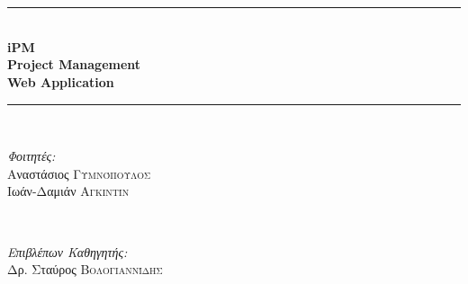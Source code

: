 \begin{titlepage}

\newcommand{\HRule}{\rule{\linewidth}{0.25mm}}

\center

 

\textsc{\LARGE {}}\\[1cm] 
\textsc{\large {}}\\[0.5cm] 

\HRule \\[0.4cm]
{ \huge \bfseries {iPM \\ Project Management \\Web Application}}\\[0.4cm]
\HRule \\[1.5cm]
 
\begin{minipage}{0.4\textwidth}
    \begin{flushleft}\large
    \emph{Φοιτητές:}\\
    \color{maroon}Αναστάσιος \textsc{\color{maroon}Γυμνόπουλος}\\
    \color{maroon}Ιωάν-Δαμιάν \textsc{\color{maroon}Αγκιντίν}
    \end{flushleft}
\end{minipage}
~
\begin{minipage}{0.4\textwidth}
    \begin{flushright}\large
    \emph{Επιβλέπων Καθηγητής:} \\
    \color{maroon}Δρ. Σταύρος \textsc{\color{maroon}Βολογιαννίδης}
    \end{flushright}
\end{minipage}\\[3cm]




\end{titlepage}
